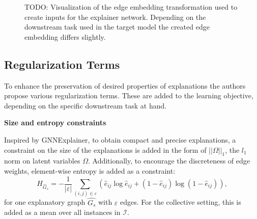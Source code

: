 \begin{figure}
\caption{TODO: Visualization of the edge embedding transformation used to create inputs for the explainer network. Depending on the downstream task used in the target model the created edge embedding differs slightly.}
\end{figure}

\subsection{Regularization Terms}
To enhance the preservation of desired properties of explanations the authors propose various regularization terms. These are added to the learning objective, depending on the specific downstream task at hand.\bigskip

\textbf{Size and entropy constraints}

Inspired by GNNExplainer\cite{ying2019gnnexplainer}, to obtain compact and precise explanations, a constraint on the size of the explanations is added in the form of $||\Omega||_1$, the $l_1$ norm on latent variables $\Omega$. Additionally, to encourage the discreteness of edge weights, element-wise entropy is added as a constraint:
\begin{equation}
    H_{\hat{G}_s} = -\frac{1}{|\varepsilon|}\sum_{(i,j)\in \varepsilon} (\hat{e}_{ij}\log \hat{e}_{ij} + (1-\hat{e}_{ij})\log(1-\hat{e}_{ij})),
\end{equation}
for one explanatory graph $\hat{G_s}$ with $\varepsilon$ edges. For the collective setting, this is added as a mean over all instances in $\mathcal{I}$. \bigskip

